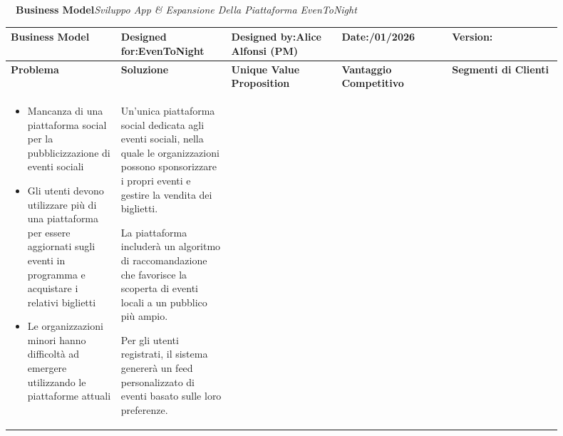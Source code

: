 \documentclass[11pt,a4paper]{article}
\begin{document}
{}

\clearpage
{}\label{sec:bmodel}
\begin{landscape}
\setlength{\textwidth}{24cm}\setlength{\linewidth}{24cm}
~~{\color{doclink}\large\bfseries Business Model}\hfill{\color{subt}\itshape Sviluppo App \& Espansione Della Piattaforma EvenToNight}\par\nopagebreak\smallskip
\scriptsize\nopagebreak

{\setlength{\arrayrulewidth}{0.6pt}
\renewcommand{\arraystretch}{1.0}
\setlength{\tabcolsep}{3pt}
\noindent\begin{tabular}{|>{\raggedright\arraybackslash}p{0.18\linewidth}|>{\raggedright\arraybackslash}p{0.18\linewidth}|>{\raggedright\arraybackslash}p{0.18\linewidth}|>{\raggedright\arraybackslash}p{0.18\linewidth}|>{\raggedright\arraybackslash}p{0.18\linewidth}|}
\hline
\rowcolor{brandbg}\textbf{\large Business Model} & Designed for:\newline EvenToNight & Designed by:\newline Alice Alfonsi (PM) & Date:\newline 13/01/2026 & Version:\newline 2 \\\hline
\rowcolor{brandbg}\textbf{Problema} & \textbf{Soluzione} & \textbf{Unique Value Proposition} & \textbf{Vantaggio Competitivo} & \textbf{Segmenti di Clienti} \\\hline
\begin{itemize}[leftmargin=1em,itemsep=1pt,topsep=2pt]
\item Mancanza di una piattaforma social per la pubblicizzazione di eventi sociali
\item Gli utenti devono utilizzare più di una piattaforma per essere aggiornati sugli eventi in programma e acquistare i relativi biglietti
\item Le organizzazioni minori hanno difficoltà ad emergere utilizzando le piattaforme attuali
\end{itemize}
&
Un’unica piattaforma social dedicata agli eventi sociali, nella quale le organizzazioni possono sponsorizzare i propri eventi e gestire la vendita dei biglietti.\par\smallskip
La piattaforma includerà un algoritmo di raccomandazione che favorisce la scoperta di eventi locali a un pubblico più ampio.\par\smallskip
Per gli utenti registrati, il sistema genererà un feed personalizzato di eventi basato sulle loro preferenze.

\end{tabular}}
\end{landscape}
\end{document}
